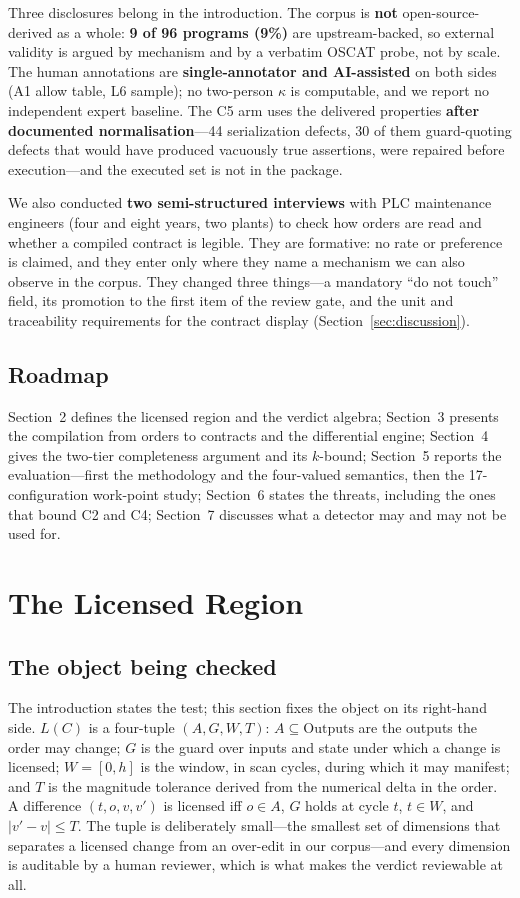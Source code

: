 \documentclass[acmsmall,screen,review,anonymous]{acmart}
\begin{document}
Three disclosures belong in the introduction. The corpus is \textbf{not} open-source-derived as a whole: \textbf{9 of 96 programs (9\%)} are upstream-backed, so external validity is argued by mechanism and by a verbatim OSCAT probe, not by scale. The human annotations are \textbf{single-annotator and AI-assisted} on both sides (A1 allow table, L6 sample); no two-person $\kappa$ is computable, and we report no independent expert baseline. The C5 arm uses the delivered properties \textbf{after documented normalisation}---44 serialization defects, 30 of them guard-quoting defects that would have produced vacuously true assertions, were repaired before execution---and the executed set is not in the package.

We also conducted \textbf{two semi-structured interviews} with PLC maintenance engineers (four and eight years, two plants) to check how orders are read and whether a compiled contract is legible. They are formative: no rate or preference is claimed, and they enter only where they name a mechanism we can also observe in the corpus. They changed three things---a mandatory ``do not touch'' field, its promotion to the first item of the review gate, and the unit and traceability requirements for the contract display (Section~\ref{sec:discussion}).

\subsection{Roadmap}

Section~2 defines the licensed region and the verdict algebra; Section~3 presents the compilation from orders to contracts and the differential engine; Section~4 gives the two-tier completeness argument and its $k$-bound; Section~5 reports the evaluation---first the methodology and the four-valued semantics, then the 17-configuration work-point study; Section~6 states the threats, including the ones that bound C2 and C4; Section~7 discusses what a detector may and may not be used for.

\section{The Licensed Region}
\label{sec:region}

\subsection{The object being checked}

The introduction states the test; this section fixes the object on its right-hand side. $L(C)$ is a four-tuple $(A,G,W,T)$: $A\subseteq\mathrm{Outputs}$ are the outputs the order may change; $G$ is the guard over inputs and state under which a change is licensed; $W=[0,h]$ is the window, in scan cycles, during which it may manifest; and $T$ is the magnitude tolerance derived from the numerical delta in the order. A difference $(t,o,v,v')$ is licensed iff $o\in A$, $G$ holds at cycle $t$, $t\in W$, and $|v'-v|\le T$. The tuple is deliberately small---the smallest set of dimensions that separates a licensed change from an over-edit in our corpus---and every dimension is auditable by a human reviewer, which is what makes the verdict reviewable at all.
\end{document}
